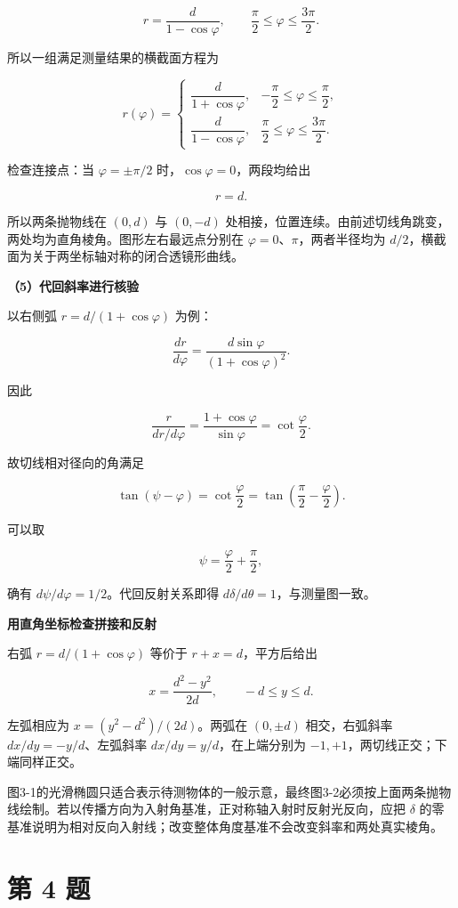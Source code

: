 \documentclass[12pt,a4paper,UTF8]{ctexart}
\begin{document}
\[r=\frac{d}{1-\cos\varphi},
\qquad \frac\pi2\le\varphi\le\frac{3\pi}2.\]

所以一组满足测量结果的横截面方程为

\[\boxed{
r(\varphi)=
\begin{cases}
\dfrac{d}{1+\cos\varphi},
&-\dfrac\pi2\le\varphi\le\dfrac\pi2,\\[8pt]
\dfrac{d}{1-\cos\varphi},
&\dfrac\pi2\le\varphi\le\dfrac{3\pi}2.
\end{cases}}
\]

检查连接点：当 \(\varphi=\pm\pi/2\) 时，\(\cos\varphi=0\)，两段均给出

\[r=d.\]

所以两条抛物线在 \((0,d)\) 与 \((0,-d)\)
处相接，位置连续。由前述切线角跳变，两处均为直角棱角。图形左右最远点分别在
\(\varphi=0\)、\(\pi\)，两者半径均为
\(d/2\)，横截面为关于两坐标轴对称的闭合透镜形曲线。

\textbf{（5）代回斜率进行核验}

以右侧弧 \(r=d/(1+\cos\varphi)\) 为例：

\[\frac{dr}{d\varphi}=
\frac{d\sin\varphi}{(1+\cos\varphi)^2}.\]

因此

\[\frac{r}{dr/d\varphi}
=\frac{1+\cos\varphi}{\sin\varphi}
=\cot\frac\varphi2.\]

故切线相对径向的角满足

\[\tan(\psi-\varphi)=\cot\frac\varphi2
=\tan\left(\frac\pi2-\frac\varphi2\right).\]

可以取

\[\psi=\frac\varphi2+\frac\pi2,\]

确有 \(d\psi/d\varphi=1/2\)。代回反射关系即得
\(d\delta/d\theta=1\)，与测量图一致。

\textbf{用直角坐标检查拼接和反射}

右弧 \(r=d/(1+\cos\varphi)\) 等价于 \(r+x=d\)，平方后给出

\[x=\frac{d^2-y^2}{2d},\qquad -d\le y\le d.\]

左弧相应为 \(x=(y^2-d^2)/(2d)\)。两弧在 \((0,\pm d)\) 相交，右弧斜率
\(dx/dy=-y/d\)、左弧斜率 \(dx/dy=y/d\)，在上端分别为
\(-1,+1\)，两切线正交；下端同样正交。

图3-1的光滑椭圆只适合表示待测物体的一般示意，最终图3-2必须按上面两条抛物线绘制。若以传播方向为入射角基准，正对称轴入射时反射光反向，应把
\(\delta\)
的零基准说明为相对反向入射线；改变整体角度基准不会改变斜率和两处真实棱角。

\newpage

\section{第 4 题}\label{ux7b2c-4-ux9898}
\end{document}

